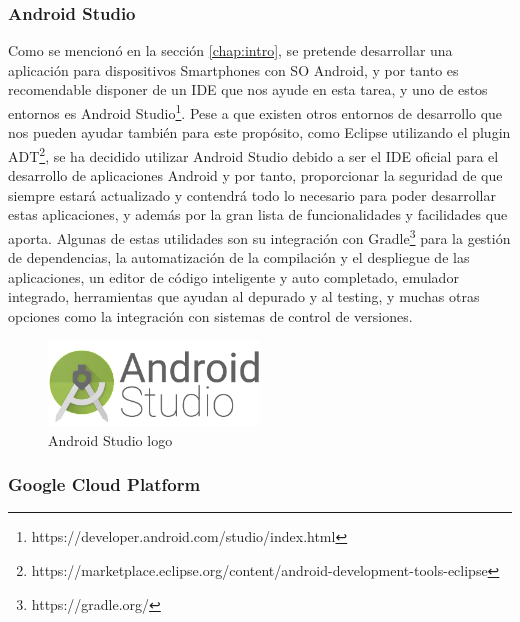 \subsubsection{Android Studio}

Como se mencionó en la sección \ref{chap:intro}, se pretende desarrollar una aplicación para dispositivos Smartphones con \acs{SO} Android, y por tanto es recomendable disponer de un \acs{IDE} que nos ayude en esta tarea, y uno de estos entornos es Android Studio\footnote{https://developer.android.com/studio/index.html}. Pese a que existen otros entornos de desarrollo que nos pueden ayudar también para este propósito, como Eclipse utilizando el plugin \acs{ADT}\footnote{https://marketplace.eclipse.org/content/android-development-tools-eclipse}, se ha decidido utilizar Android Studio debido a ser el \acs{IDE} oficial para el desarrollo de aplicaciones Android y por tanto, proporcionar la seguridad de que siempre estará actualizado y contendrá todo lo necesario para poder desarrollar estas aplicaciones, y además por la gran lista de funcionalidades y facilidades que aporta. Algunas de estas utilidades son su integración con Gradle\footnote{https://gradle.org/} para la gestión de dependencias, la automatización de la compilación y el despliegue de las aplicaciones, un editor de código inteligente y auto completado, emulador integrado, herramientas que ayudan al depurado y al testing, y muchas otras opciones como la integración con sistemas de control de versiones.

\begin{figure}[!h]
\begin{center}
\includegraphics[width=0.5\textwidth]{./figures/android-studio.png}
\caption{Android Studio logo}
\label{fig:android-studio}
\end{center}
\end{figure}

\subsubsection{Google Cloud Platform}
\label{GCP}

